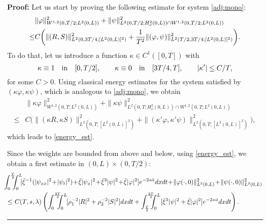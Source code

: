 \documentclass[10pt]{article}
\newenvironment{proof}[1][Proof]
{\noindent\textbf{#1:} }{\hfill\rule{0.5em}{0.5em}}
\def\\Phivec{\mathbf{\Phi}}
\begin{document}
\begin{proof}
	Let us start by proving the following estimate for system \eqref{adj:mono}:
\begin{equation}\label{energy_est}
\begin{alignedat}{2}
		&\|\varphi\|^2_{ W^{1,2}(0,T/2;L^2(0,L))}+
		\|\psi\|^2_{L^2(0,T/2;H^2_\nu(0,L))\cap W^{1,2}(0,T/2;L^2(0,L))}\\
		\le &
		C\bigg(\|(R,S)\|^2_{L^2(0,3T/4;[L^2(0,L)]^2)}+{1\over T^2}\|(\varphi,\psi)\|^2_{L^2(T/2,3T/4;[L^2(0,L)]^2)}\bigg).
\end{alignedat}
\end{equation}
	To do that, let us introduce a function $\kappa\in C^1([0,T])$ with
$$
	\kappa\equiv1\quad\hbox{in}\quad [0,T/2],
	\qquad\kappa\equiv0\quad\hbox{in}\quad [3T/4,T],
	\qquad |\kappa'|\leq C/T,
$$
	for some $C>0$. Using classical energy estimates for the system satisfied by $(\kappa\varphi,\kappa\psi)$, which is
	analogous to \eqref{adj:mono}, we obtain
\begin{align*}
		&\|\kappa\varphi\|^2_{ W^{1,2}(0,T;L^2(0,L))}+
		\|\kappa\psi\|^2_{L^2(0,T;H^2_\nu(0,L))\cap W^{1,2}(0,T;L^2(0,L))}\\
		\le &
		C\bigg(\|(\kappa R,\kappa S)\|^2_{L^2(0,T;[L^2(0,L)]^2)}+\|(\kappa'\varphi,\kappa'\psi)\|^2_{L^2(0,T;[L^2(0,L)]^2)}\bigg),
\end{align*}
	which leads to \eqref{energy_est}.
	
	Since the weights are bounded from above and below, using \eqref{energy_est}, we obtain
	a first estimate in $(0,L)\times(0,T/2)$:
\begin{equation}\label{carleman_001}
\begin{alignedat}{2}
		&\!\!\!\!\!\!\!\!\!\int_0^{T\over2}\!\!\!\!\int_0^L\!\![{\bar\xi}^{-1}(|\psi_{xx}|^2\!+\!|\psi_t|^2)\!+\!\bar\xi|\psi_x|^2
		\!+\!\bar\xi^3|\psi|^2\!+\!\bar\xi|\varphi |^2 ]e^{-2s\bar\alpha}dxdt
		\!+\!\|\varphi(\cdot,0)\|^2_{L^2(0,L)}\!+\!\|\psi(\cdot,0)\|^2_{L^2(0,L)} \\
		\le &~C(T,s,\lambda)
		\left(\int_0^{3T\over4}\!\!\!\!\!\int_0^L\![\rho_1^{-2}|R|^2+\rho_2^{-2}|S|^2] dxdt +
		 \int_{T\over2}^{3T\over4}\!\!\!\!\!\int_0^L[\bar\xi^3|\psi|^2+\bar\xi|\varphi |^2 ]e^{-2s\bar\alpha}dxdt\right).
\end{alignedat}
\end{equation}	
	

\end{proof}
\end{document}
